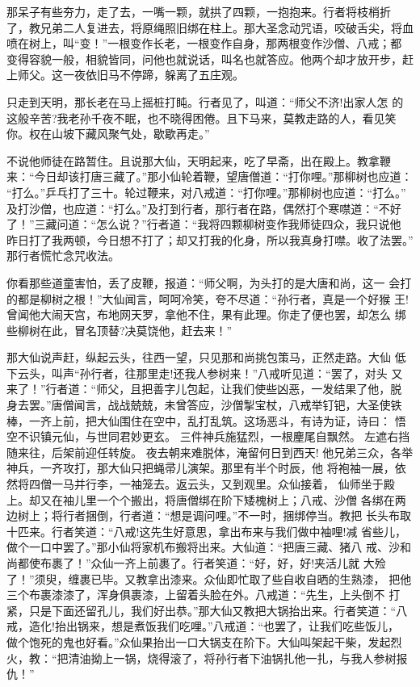 那呆子有些夯力，走了去，一嘴一颗，就拱了四颗，一抱抱来。行者将枝梢折
了，教兄弟二人复进去，将原绳照旧绑在柱上。那大圣念动咒语，咬破舌尖，将血
喷在树上，叫“变！”一根变作长老，一根变作自身，那两根变作沙僧、八戒；都
变得容貌一般，相貌皆同，问他也就说话，叫名也就答应。他两个却才放开步，赶
上师父。这一夜依旧马不停蹄，躲离了五庄观。

只走到天明，那长老在马上摇桩打盹。行者见了，叫道：“师父不济!出家人怎
的这般辛苦?我老孙千夜不眠，也不晓得困倦。且下马来，莫教走路的人，看见笑
你。权在山坡下藏风聚气处，歇歇再走。”

不说他师徒在路暂住。且说那大仙，天明起来，吃了早斋，出在殿上。教拿鞭
来：“今日却该打唐三藏了。”那小仙轮着鞭，望唐僧道：“打你哩。”那柳树也应道：
“打么。”乒乓打了三十。轮过鞭来，对八戒道：“打你哩。”那柳树也应道：“打么。”
及打沙僧，也应道：“打么。”及打到行者，那行者在路，偶然打个寒噤道：“不好
了！”三藏问道：“怎么说？”行者道：“我将四颗柳树变作我师徒四众，我只说他
昨日打了我两顿，今日想不打了；却又打我的化身，所以我真身打噤。收了法罢。”
那行者慌忙念咒收法。

你看那些道童害怕，丢了皮鞭，报道：“师父啊，为头打的是大唐和尚，这一
会打的都是柳树之根！”大仙闻言，呵呵冷笑，夸不尽道：“孙行者，真是一个好猴
王!曾闻他大闹天宫，布地网天罗，拿他不住，果有此理。你走了便也罢，却怎么
绑些柳树在此，冒名顶替?决莫饶他，赶去来！”

那大仙说声赶，纵起云头，往西一望，只见那和尚挑包策马，正然走路。大仙
低下云头，叫声“孙行者，往那里走!还我人参树来！”八戒听见道：“罢了，对头
又来了！”行者道：“师父，且把善字儿包起，让我们使些凶恶，一发结果了他，脱
身去罢。”唐僧闻言，战战兢兢，未曾答应，沙僧掣宝杖，八戒举钉钯，大圣使铁
棒，一齐上前，把大仙围住在空中，乱打乱筑。这场恶斗，有诗为证，诗曰：
悟空不识镇元仙，与世同君妙更玄。
三件神兵施猛烈，一根麈尾自飘然。
左遮右挡随来往，后架前迎任转旋。
夜去朝来难脱体，淹留何日到西天!
他兄弟三众，各举神兵，一齐攻打，那大仙只把蝇帚儿演架。那里有半个时辰，他
将袍袖一展，依然将四僧一马并行李，一袖笼去。返云头，又到观里。众仙接着，
仙师坐于殿上。却又在袖儿里一个个搬出，将唐僧绑在阶下矮槐树上；八戒、沙僧
各绑在两边树上；将行者捆倒，行者道：“想是调问哩。”不一时，捆绑停当。教把
长头布取十匹来。行者笑道：“八戒!这先生好意思，拿出布来与我们做中袖哩!减
省些儿，做个一口中罢了。”那小仙将家机布搬将出来。大仙道：“把唐三藏、猪八
戒、沙和尚都使布裹了！”众仙一齐上前裹了。行者笑道：“好，好，好!夹活儿就
大殓了！”须臾，缠裹已毕。又教拿出漆来。众仙即忙取了些自收自晒的生熟漆，
把他三个布裹漆漆了，浑身俱裹漆，上留着头脸在外。八戒道：“先生，上头倒不
打紧，只是下面还留孔儿，我们好出恭。”那大仙又教把大锅抬出来。行者笑道：“八
戒，造化!抬出锅来，想是煮饭我们吃哩。”八戒道：“也罢了，让我们吃些饭儿，
做个饱死的鬼也好看。”众仙果抬出一口大锅支在阶下。大仙叫架起干柴，发起烈
火，教：“把清油拗上一锅，烧得滚了，将孙行者下油锅扎他一扎，与我人参树报
仇！”

